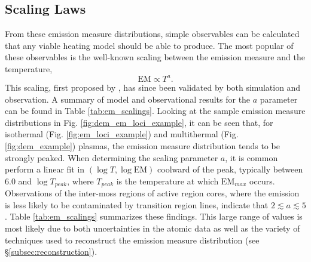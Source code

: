\subsection{Scaling Laws}
\label{subsec:scaling}
%
\par From these emission measure distributions, simple observables can be calculated that any viable heating model should be able to produce. The most popular of these observables is the well-known scaling between the emission measure and the temperature, 
\begin{equation}
	\mathrm{EM}\propto T^a.
\end{equation}
This scaling, first proposed by \citet{jordan_energy_1980}, has since been validated by both simulation and observation. A summary of model and observational results for the $a$ parameter can be found in Table \ref{tab:em_scalings}. Looking at the sample emission measure distributions in Fig. \ref{fig:dem_em_loci_example}, it can be seen that, for isothermal (Fig. \ref{fig:em_loci_example}) and multithermal (Fig. \ref{fig:dem_example}) plasmas, the emission measure distribution tends to be strongly peaked. When determining the scaling parameter $a$, it is common perform a linear fit in $(\log{T},\log{\mathrm{EM}})$ coolward of the peak, typically between 6.0 and $\log{T_{peak}}$, where $T_{peak}$ is the temperature at which $\mathrm{EM}_{max}$ occurs. Observations of the inter-moss regions of active region cores, where the emission is less likely to be contaminated by transition region lines, indicate that $2\lesssim a\lesssim5$. Table \ref{tab:em_scalings} summarizes these findings. This large range of values is most likely due to both uncertainties in the atomic data as well as the variety of techniques used to reconstruct the emission measure distribution (see \S\ref{subsec:reconstruction}).
%
